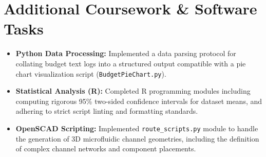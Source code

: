 \documentclass[11pt,a4paper]{article}
\begin{document}
\section*{Additional Coursework \& Software Tasks}
\begin{itemize}[label=\textcolor{secondary}{$\bullet$}, itemsep=0.4em]
    \item \textbf{Python Data Processing:} Implemented a data parsing protocol for collating budget text logs into a structured output compatible with a pie chart visualization script (\texttt{BudgetPieChart.py}).
    \item \textbf{Statistical Analysis (R):} Completed R programming modules including computing rigorous 95\% two-sided confidence intervals for dataset means, and adhering to strict script linting and formatting standards.
    \item \textbf{OpenSCAD Scripting:} Implemented \texttt{route\_scripts.py} module to handle the generation of 3D microfluidic channel geometries, including the definition of complex channel networks and component placements.
\end{itemize}
\end{document}
